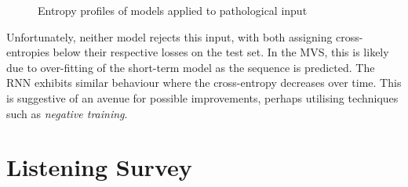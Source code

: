 \documentclass[12pt,a4paper,twoside,openright]{report}
\begin{document}
\begin{figure}[H]
\centering
{}

\caption{Entropy profiles of models applied to pathological input}
\label{fig:path-profiles}
\end{figure}

Unfortunately, neither model rejects this input, with both assigning
cross-entropies below their respective losses on the test set. In the MVS, this
is likely due to over-fitting of the short-term model as the sequence is
predicted. The RNN exhibits similar behaviour where the cross-entropy decreases
over time. This is suggestive of an avenue for possible improvements, perhaps
utilising techniques such as \emph{negative training}.

\section{Listening Survey}
\end{document}
